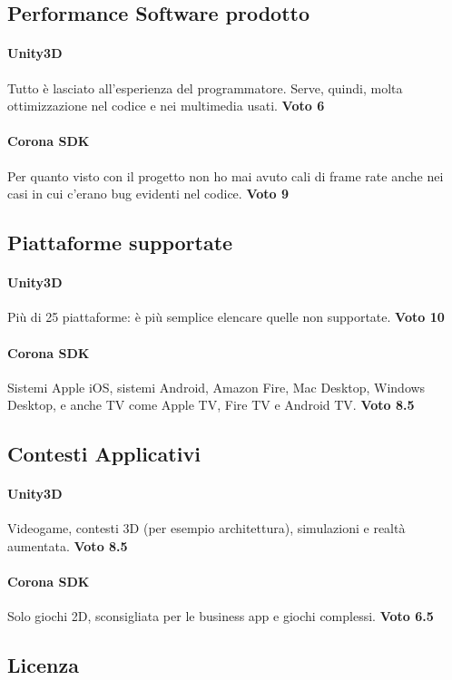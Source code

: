 	\subsection*{Performance Software prodotto}
		\paragraph{Unity3D} Tutto è lasciato all'esperienza del programmatore. Serve, quindi, molta ottimizzazione nel codice e nei multimedia usati. \textbf{Voto 6}
		\paragraph{Corona SDK} Per quanto visto con il progetto non ho mai avuto cali di frame rate anche nei casi in cui c'erano bug evidenti nel codice. \textbf{Voto 9}
	
	\subsection*{Piattaforme supportate}
		\paragraph{Unity3D} Più di 25 piattaforme: è più semplice elencare quelle non supportate. \textbf{Voto 10}
		\paragraph{Corona SDK} Sistemi Apple iOS, sistemi Android, Amazon Fire, Mac Desktop, Windows Desktop, e anche TV come Apple TV, Fire TV e Android TV. \textbf{Voto 8.5}
	
	\subsection*{Contesti Applicativi}
		\paragraph{Unity3D} Videogame, contesti 3D (per esempio architettura), simulazioni e realtà aumentata. \textbf{Voto 8.5}
		\paragraph{Corona SDK} Solo giochi 2D, sconsigliata per le business app e giochi complessi. \textbf{Voto 6.5}
	
	\subsection*{Licenza}
